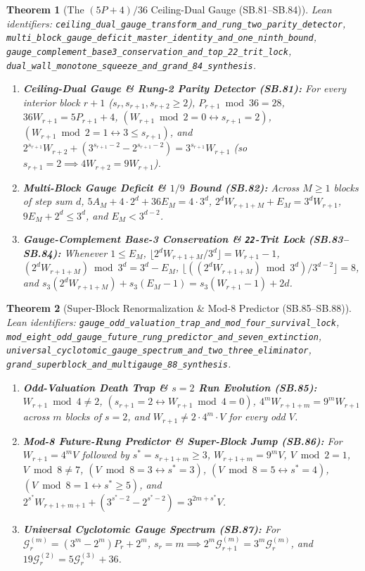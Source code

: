 \documentclass[11pt]{article}
\newtheorem{theorem}{Theorem}[section]
\begin{document}
\begin{theorem}[The $(5P+4)/36$ Ceiling-Dual Gauge (SB.81--SB.84)]
\emph{Lean identifiers:} \nolinkurl{ceiling_dual_gauge_transform_and_rung_two_parity_detector}, \nolinkurl{multi_block_gauge_deficit_master_identity_and_one_ninth_bound}, \nolinkurl{gauge_complement_base3_conservation_and_top_22_trit_lock}, \nolinkurl{dual_wall_monotone_squeeze_and_grand_84_synthesis}.
\begin{enumerate}
  \item \textbf{Ceiling-Dual Gauge \& Rung-2 Parity Detector (SB.81):} For every interior block $r + 1$ ($s_r, s_{r+1}, s_{r+2} \ge 2$), $P_{r+1} \bmod 36 = 28$, $36 W_{r+1} = 5 P_{r+1} + 4$, $(W_{r+1} \bmod 2 = 0 \leftrightarrow s_{r+1} = 2)$, $(W_{r+1} \bmod 2 = 1 \leftrightarrow 3 \le s_{r+1})$, and $2^{s_{r+1}} W_{r+2} + (3^{s_{r+1}-2} - 2^{s_{r+1}-2}) = 3^{s_{r+1}} W_{r+1}$ (so $s_{r+1} = 2 \implies 4 W_{r+2} = 9 W_{r+1}$).
  \item \textbf{Multi-Block Gauge Deficit \& $1/9$ Bound (SB.82):} Across $M \ge 1$ blocks of step sum $d$, $5 A_M + 4 \cdot 2^d + 36 E_M = 4 \cdot 3^d$, $2^d W_{r+1+M} + E_M = 3^d W_{r+1}$, $9 E_M + 2^d \le 3^d$, and $E_M < 3^{d-2}$.
  \item \textbf{Gauge-Complement Base-3 Conservation \& \texttt{22}-Trit Lock (SB.83--SB.84):} Whenever $1 \le E_M$, $\lfloor 2^d W_{r+1+M} / 3^d \rfloor = W_{r+1} - 1$, $(2^d W_{r+1+M}) \bmod 3^d = 3^d - E_M$, $\lfloor ((2^d W_{r+1+M}) \bmod 3^d) / 3^{d-2} \rfloor = 8$, and $s_3(2^d W_{r+1+M}) + s_3(E_M - 1) = s_3(W_{r+1} - 1) + 2 d$.
\end{enumerate}
\end{theorem}

\begin{theorem}[Super-Block Renormalization \& Mod-8 Predictor (SB.85--SB.88)]
\emph{Lean identifiers:} \nolinkurl{gauge_odd_valuation_trap_and_mod_four_survival_lock}, \nolinkurl{mod_eight_odd_gauge_future_rung_predictor_and_seven_extinction}, \nolinkurl{universal_cyclotomic_gauge_spectrum_and_two_three_eliminator}, \nolinkurl{grand_superblock_and_multigauge_88_synthesis}.
\begin{enumerate}
  \item \textbf{Odd-Valuation Death Trap \& $s=2$ Run Evolution (SB.85):} $W_{r+1} \bmod 4 \ne 2$, $(s_{r+1} = 2 \leftrightarrow W_{r+1} \bmod 4 = 0)$, $4^m W_{r+1+m} = 9^m W_{r+1}$ across $m$ blocks of $s=2$, and $W_{r+1} \ne 2 \cdot 4^m \cdot V$ for every odd $V$.
  \item \textbf{Mod-8 Future-Rung Predictor \& Super-Block Jump (SB.86):} For $W_{r+1} = 4^m V$ followed by $s^* = s_{r+1+m} \ge 3$, $W_{r+1+m} = 9^m V$, $V \bmod 2 = 1$, $V \bmod 8 \ne 7$, $(V \bmod 8 = 3 \leftrightarrow s^* = 3)$, $(V \bmod 8 = 5 \leftrightarrow s^* = 4)$, $(V \bmod 8 = 1 \leftrightarrow s^* \ge 5)$, and $2^{s^*} W_{r+1+m+1} + (3^{s^*-2} - 2^{s^*-2}) = 3^{2m+s^*} V$.
  \item \textbf{Universal Cyclotomic Gauge Spectrum (SB.87):} For $\mathcal{G}_r^{(m)} = (3^m - 2^m) P_r + 2^m$, $s_r = m \implies 2^m \mathcal{G}_{r+1}^{(m)} = 3^m \mathcal{G}_r^{(m)}$, and $19 \mathcal{G}_r^{(2)} = 5 \mathcal{G}_r^{(3)} + 36$.
\end{enumerate}
\end{theorem}
\end{document}
